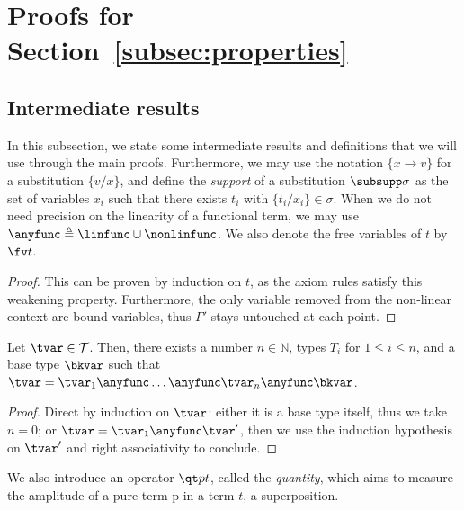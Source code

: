 \section{Proofs for Section~\ref{subsec:properties}}

\subsection{Intermediate results}

In this subsection, we state some intermediate results
and definitions that we will use through the main proofs.
Furthermore, we may use the notation $\{x \to v\}$ for a
substitution $\{ v / x \}$, and define the \emph{support} of
a substitution $\subsupp \sigma$ as the set of variables $x_i$
such that there exists $t_i$ with $\{ t_i / x_i \} \in \sigma$.
When we do not need precision on the linearity of a functional term,
we may use $\anyfunc \triangleq \linfunc \cup \nonlinfunc$.
We also denote the free variables of $t$ by $\fv t$.

\weakening*

\begin{proof}
  This can be proven by induction on $t$, as the axiom rules satisfy
  this weakening property.
  Furthermore, the only variable removed from the non-linear context
  are bound variables,
  thus $\Gamma'$ stays untouched at each point. \qedhere
\end{proof}

\begin{lemma}\label{lem:functype}
  Let $\tvar \in \mathcal T$.  Then, there exists a number
  $n \in \mathbb N$, types $T_i$ for $1 \leq i \leq n$,
  and a base type $\bkvar$ such that
  $\tvar = \tvar_1 \anyfunc \dots \anyfunc \tvar_n \anyfunc \bkvar$.
\end{lemma}

\begin{proof}
  Direct by induction on $\tvar$: either it is a base type itself, thus we take
  $n = 0$; or $\tvar = \tvar_1 \anyfunc \tvar'$, then we use the induction
  hypothesis on $\tvar'$ and right associativity to conclude. \qedhere
\end{proof}

We also introduce an operator $\qt p t$, called the \emph{quantity},
which aims to measure the amplitude of a pure term p in a term $t$,
\eg{} a superposition.

